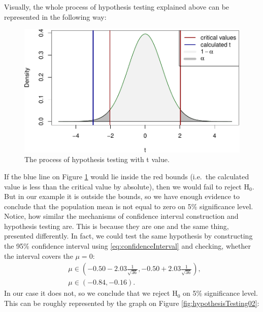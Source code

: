 \documentclass[
]{book}
\theoremstyle{definition}
\theoremstyle{definition}
\theoremstyle{definition}
\theoremstyle{definition}
\theoremstyle{remark}
\begin{document}
Visually, the whole process of hypothesis testing explained above can be represented in the following way:

\begin{figure}
\centering
\includegraphics{Svetunkov---Statistics-for-Business-Analytics_files/figure-latex/hypothesisTesting01-1.pdf}
\caption{\label{fig:hypothesisTesting01}The process of hypothesis testing with t value.}
\end{figure}

If the blue line on Figure \ref{fig:hypothesisTesting01} would lie inside the red bounds (i.e.~the calculated value is less than the critical value by absolute), then we would fail to reject \(\mathrm{H}_0\). But in our example it is outside the bounds, so we have enough evidence to conclude that the population mean is not equal to zero on 5\% significance level. Notice, how similar the mechanisms of confidence interval construction and hypothesis testing are. This is because they are one and the same thing, presented differently. In fact, we could test the same hypothesis by constructing the 95\% confidence interval using \eqref{eq:confidenceInterval} and checking, whether the interval covers the \(\mu=0\):
\begin{equation*}
    \begin{aligned}
        & \mu \in \left(-0.50 -2.03 \frac{1}{\sqrt{36}}, -0.50 + 2.03 \frac{1}{\sqrt{36}} \right), \\
        & \mu \in (-0.84, -0.16).
    \end{aligned}
\end{equation*}
In our case it does not, so we conclude that we reject \(\mathrm{H}_0\) on 5\% significance level. This can be roughly represented by the graph on Figure \ref{fig:hypothesisTesting02}:
\end{document}
